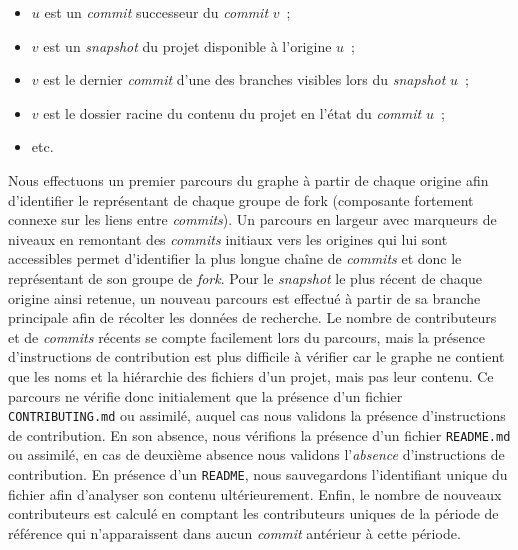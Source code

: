 \documentclass[dvipsnames,runningheads]{llncs}
\newcommand{\en}[1]{\foreignlanguage{english}{\emph{#1}}}
\begin{document}
    \begin{itemize}
        \item $u$ est un \en{commit} successeur du \en{commit} $v$ ;
        \item $v$ est un \en{snapshot} du projet disponible à l'origine $u$ ;
        \item $v$ est le dernier \en{commit} d'une des branches visibles lors du \en{snapshot} $u$ ;
        \item $v$ est le dossier racine du contenu du projet en l'état du \en{commit} $u$ ;
        \item etc.
    \end{itemize}

    Nous effectuons un premier parcours du graphe à partir de chaque origine afin d'identifier le représentant
    de chaque groupe de fork (composante fortement connexe sur les liens entre \en{commits}). Un parcours en
    largeur avec marqueurs de niveaux en remontant des \en{commits} initiaux vers les origines qui lui sont
    accessibles permet d'identifier la plus longue chaîne de \en{commits} et donc le représentant de son
    groupe de \en{fork}. Pour le \en{snapshot} le plus récent de chaque origine ainsi retenue, un nouveau
    parcours est effectué à partir de sa branche principale afin de récolter les données de recherche. Le
    nombre de contributeurs et de \en{commits} récents se compte facilement lors du parcours, mais la présence
    d'instructions de contribution est plus difficile à vérifier car le graphe ne contient que les noms et la
    hiérarchie des fichiers d'un projet, mais pas leur contenu. Ce parcours ne vérifie donc initialement que
    la présence d'un fichier \texttt{CONTRIBUTING.md} ou assimilé, auquel cas nous validons la présence
    d'instructions de contribution. En son absence, nous vérifions la présence d'un fichier \texttt{README.md}
    ou assimilé, en cas de deuxième absence nous validons l'\emph{absence} d'instructions de contribution. En
    présence d'un \texttt{README}, nous sauvegardons l'identifiant unique du fichier afin d'analyser son
    contenu ultérieurement. Enfin, le nombre de nouveaux contributeurs est calculé en comptant les
    contributeurs uniques de la période de référence qui n'apparaissent dans aucun \en{commit} antérieur à
    cette période.
\end{document}
